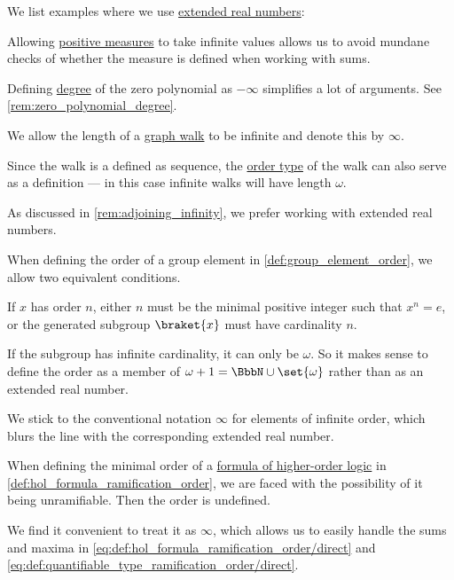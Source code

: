 \begin{example}\label{ex:def:extended_real_numbers}
  We list examples where we use \hyperref[def:extended_real_numbers]{extended real numbers}:
  \begin{thmenum}
     Allowing \hyperref[def:measure/positive]{positive measures} to take infinite values allows us to avoid mundane checks of whether the measure is defined when working with sums.

     Defining \hyperref[def:polynomial_degree]{degree} of the zero polynomial as \( -\infty \) simplifies a lot of arguments. See \cref{rem:zero_polynomial_degree}.

     We allow the length of a \hyperref[def:graph_walk]{graph walk} to be infinite and denote this by \( \infty \).

    Since the walk is a defined as sequence, the \hyperref[thm:well_ordered_order_type_existence]{order type} of the walk can also serve as a definition --- in this case infinite walks will have length \( \omega \).

    As discussed in \cref{rem:adjoining_infinity}, we prefer working with extended real numbers.

     When defining the order of a group element in \cref{def:group_element_order}, we allow two equivalent conditions.

    If \( x \) has order \( n \), either \( n \) must be the minimal positive integer such that \( x^n = e \), or the generated subgroup \( \braket{ x } \) must have cardinality \( n \).

    If the subgroup has infinite cardinality, it can only be \( \omega \). So it makes sense to define the order as a member of \( \omega + 1 = \BbbN \cup \set{ \omega } \) rather than as an extended real number.

    We stick to the conventional notation \( \infty \) for elements of infinite order, which blurs the line with the corresponding extended real number.

     When defining the minimal order of a \hyperref[def:hol_expression/formula]{formula of higher-order logic} in \cref{def:hol_formula_ramification_order}, we are faced with the possibility of it being unramifiable. Then the order is undefined.

    We find it convenient to treat it as \( \infty \), which allows us to easily handle the sums and maxima in \eqref{eq:def:hol_formula_ramification_order/direct} and \eqref{eq:def:quantifiable_type_ramification_order/direct}.
  \end{thmenum}
\end{example}

